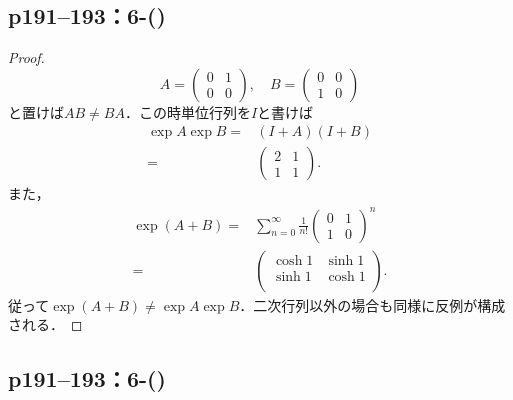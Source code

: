 \subsection*{p191--193：6-()}
\begin{tleftbar}
    \begin{proof}
        \[
            A =
            \begin{pmatrix}
                0 & 1 \\
                0 & 0
            \end{pmatrix}, \quad
            B =
            \begin{pmatrix}
                0 & 0 \\
                1 & 0
            \end{pmatrix}
        \]
        と置けば$AB \neq BA$．この時単位行列を$I$と書けば
        \begin{align*}
            \exp A \exp B ={} & (I + A) (I + B) \\
            ={}               &
            \begin{pmatrix}
                2 & 1 \\
                1 & 1
            \end{pmatrix}.
        \end{align*}
        また，
        \begin{align*}
            \exp(A + B) ={} & \sum_{n=0}^\infty \frac{1}{n!} \begin{pmatrix} 0 & 1 \\ 1 & 0\end{pmatrix}^n \\
            ={}             &
            \begin{pmatrix}
                \cosh 1 & \sinh 1 \\
                \sinh 1 & \cosh 1 \\
            \end{pmatrix}.
        \end{align*}
        従って$\exp(A + B) \neq \exp A \exp B$．二次行列以外の場合も同様に反例が構成される．
    \end{proof}
\end{tleftbar}


\subsection*{p191--193：6-()}

